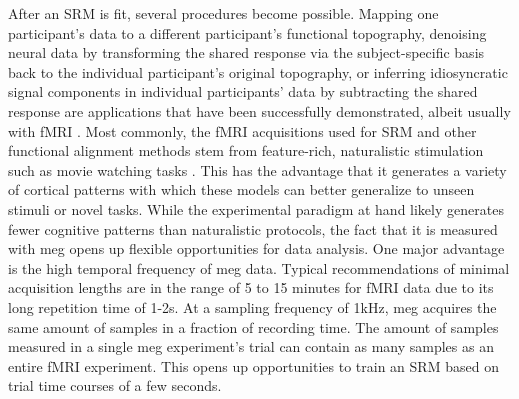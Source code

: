 After an \gls{SRM} is fit, several procedures become possible.
Mapping one participant's data to a different participant's functional topography, denoising neural data by transforming the shared response via the subject-specific basis back to the individual participant's original topography, or inferring idiosyncratic signal components in individual participants' data by subtracting the shared response are applications that have been successfully demonstrated, albeit usually with \gls{fMRI} \citep{bazeille2021empirical, NIPS2015_b3967a0e, kalyani2023reduced}.
Most commonly, the \gls{fMRI} acquisitions used for \gls{SRM} and other functional alignment methods stem from feature-rich, naturalistic stimulation such as movie watching tasks \citep{haxby2020hyperalignment}.
This has the advantage that it generates a variety of cortical patterns with which these models can better generalize to unseen stimuli or novel tasks.
While the experimental paradigm at hand likely generates fewer cognitive patterns than naturalistic protocols, the fact that it is measured with \gls{meg} opens up flexible opportunities for data analysis.
One major advantage is the high temporal frequency of \gls{meg} data.
Typical recommendations of minimal acquisition lengths are in the range of 5 to 15 minutes for \gls{fMRI} data \citep{hauslerPHD} due to its long repetition time of 1-2s.
At a sampling frequency of 1kHz, \gls{meg} acquires the same amount of samples in a fraction of recording time.
The amount of samples measured in a single \gls{meg} experiment's trial can contain as many samples as an entire \gls{fMRI} experiment.
This opens up opportunities to train an \gls{SRM} based on trial time courses of a few seconds.\\ %

